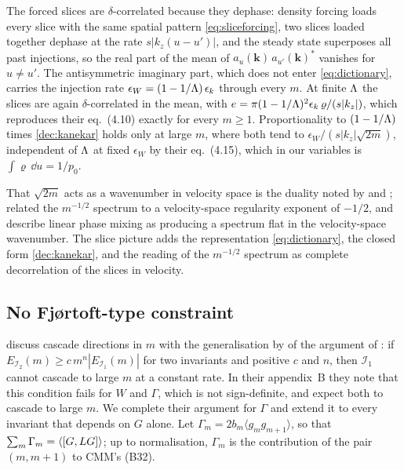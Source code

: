 The forced slices are $\delta$-correlated because they dephase: density forcing loads every slice with the same spatial pattern \eqref{eq:sliceforcing}, two slices loaded together dephase at the rate $s|k_z(u-u')|$, and the steady state superposes all past injections, so the real part of the mean of $a_u(\boldsymbol k)\,a_{u'}(\boldsymbol k)^*$ vanishes for $u\ne u'$. The antisymmetric imaginary part, which does not enter \eqref{eq:dictionary}, carries the injection rate $\epsilon_W=(1-1/\Lambda)\,\epsilon_k$ through every $m$. At finite $\Lambda$ the slices are again $\delta$-correlated in the mean, with $e=\pi(1-1/\Lambda)^2\epsilon_k\,\varrho/(s|k_z|)$, which reproduces their eq.~(4.10) exactly for every $m\ge1$. Proportionality to $(1-1/\Lambda)$ times \eqref{dec:kanekar} holds only at large $m$, where both tend to $\epsilon_W/(s|k_z|\sqrt{2m})$, independent of $\Lambda$ at fixed $\epsilon_W$ by their eq.~(4.15), which in our variables is $\int\varrho\,\dd u=1/p_0$.

That $\sqrt{2m}$ acts as a wavenumber in velocity space is the duality noted by \citet{Schekochihin2016} and \citet{AdkinsSchekochihin2018}; \citet[note~81]{Eyink2018} related the $m^{-1/2}$ spectrum to a velocity-space regularity exponent of $-1/2$, and \citet{Nastac2024} describe linear phase mixing as producing a spectrum flat in the velocity-space wavenumber. The slice picture adds the representation \eqref{eq:dictionary}, the closed form \eqref{dec:kanekar}, and the reading of the $m^{-1/2}$ spectrum as complete decorrelation of the slices in velocity.

\subsection{No Fj{\o}rtoft-type constraint}\label{dec:sec-fjortoft}

\citet[section~4.1]{Chandran2026} discuss cascade directions in $m$ with the generalisation by \citet{AlexakisBiferale2018} of the argument of \citet{Fjortoft1953}: if $E_{\mathcal I_2}(m)\ge c\,m^n|E_{\mathcal I_1}(m)|$ for two invariants and positive $c$ and $n$, then $\mathcal I_1$ cannot cascade to large $m$ at a constant rate. In their appendix~B they note that this condition fails for $W$ and $\Gamma$, which is not sign-definite, and expect both to cascade to large $m$. We complete their argument for $\Gamma$ and extend it to every invariant that depends on $G$ alone. Let $\Gamma_m=2b_m\langle g_mg_{m+1}\rangle$, so that $\sum_m\Gamma_m=\langle[G,LG]\rangle$; up to normalisation, $\Gamma_m$ is the contribution of the pair $(m,m+1)$ to CMM's (B32).

